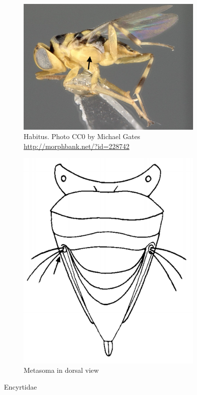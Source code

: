 \documentclass[letterpaper, 11pt]{article}
\begin{document}
\begin{figure}[ht!]
  \centering
\begin{subfigure}[ht!]{0.55\textwidth}
    \includegraphics[width=\textwidth]{EncyrtidHabitus}
  \caption{Habitus. Photo CC0 by Michael Gates \url{http://morphbank.net/?id=228742}}
  \label{fig:encyrt1}
\end{subfigure}
    \hfill
\begin{subfigure}[ht!]{0.35\textwidth}
    \includegraphics[width=\textwidth]{EncyrtidMetasoma}
  \caption{Metasoma in dorsal view \citep[][pg. 581]{goulet1993hymenoptera}}
  \label{fig:encyrt2}
\end{subfigure}
    \caption{Encyrtidae}\label{fig:encyrt}
\end{figure}
\end{document}
